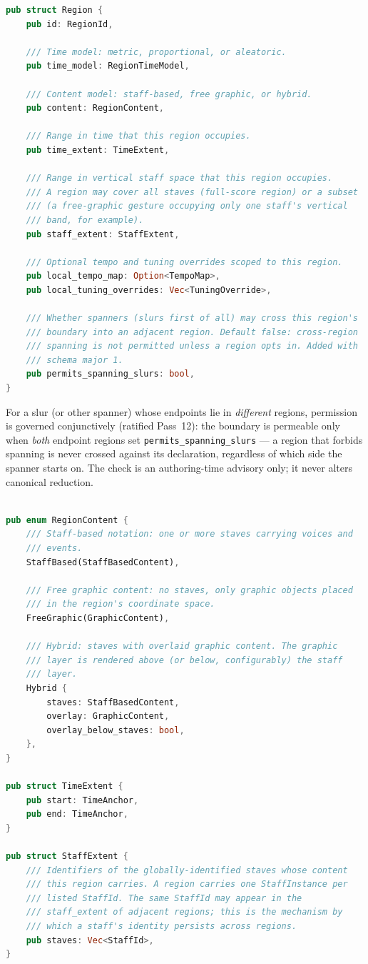 \documentclass[11pt,letterpaper]{report}
\begin{document}
\begin{lstlisting}[language=Rust]
pub struct Region {
    pub id: RegionId,

    /// Time model: metric, proportional, or aleatoric.
    pub time_model: RegionTimeModel,

    /// Content model: staff-based, free graphic, or hybrid.
    pub content: RegionContent,

    /// Range in time that this region occupies.
    pub time_extent: TimeExtent,

    /// Range in vertical staff space that this region occupies.
    /// A region may cover all staves (full-score region) or a subset
    /// (a free-graphic gesture occupying only one staff's vertical
    /// band, for example).
    pub staff_extent: StaffExtent,

    /// Optional tempo and tuning overrides scoped to this region.
    pub local_tempo_map: Option<TempoMap>,
    pub local_tuning_overrides: Vec<TuningOverride>,

    /// Whether spanners (slurs first of all) may cross this region's
    /// boundary into an adjacent region. Default false: cross-region
    /// spanning is not permitted unless a region opts in. Added with
    /// schema major 1.
    pub permits_spanning_slurs: bool,
}
\end{lstlisting}

For a slur (or other spanner) whose endpoints lie in \emph{different}
regions, permission is governed conjunctively (ratified Pass~12):
the boundary is permeable only when \emph{both} endpoint regions set
\texttt{permits\_spanning\_slurs} --- a region that forbids spanning
is never crossed against its declaration, regardless of which side
the spanner starts on. The check is an authoring-time advisory only;
it never alters canonical reduction.

\begin{lstlisting}[language=Rust]

pub enum RegionContent {
    /// Staff-based notation: one or more staves carrying voices and
    /// events.
    StaffBased(StaffBasedContent),

    /// Free graphic content: no staves, only graphic objects placed
    /// in the region's coordinate space.
    FreeGraphic(GraphicContent),

    /// Hybrid: staves with overlaid graphic content. The graphic
    /// layer is rendered above (or below, configurably) the staff
    /// layer.
    Hybrid {
        staves: StaffBasedContent,
        overlay: GraphicContent,
        overlay_below_staves: bool,
    },
}

pub struct TimeExtent {
    pub start: TimeAnchor,
    pub end: TimeAnchor,
}

pub struct StaffExtent {
    /// Identifiers of the globally-identified staves whose content
    /// this region carries. A region carries one StaffInstance per
    /// listed StaffId. The same StaffId may appear in the
    /// staff_extent of adjacent regions; this is the mechanism by
    /// which a staff's identity persists across regions.
    pub staves: Vec<StaffId>,
}
\end{lstlisting}
\end{document}
